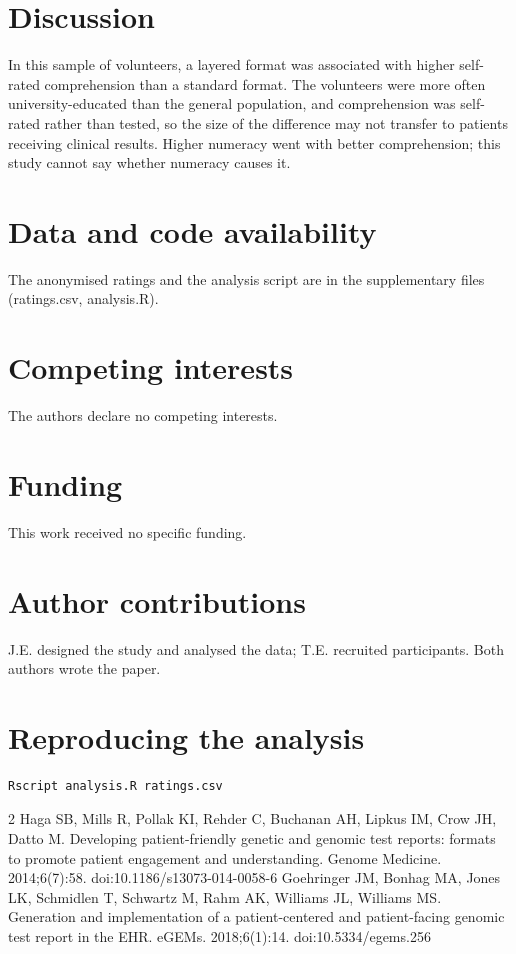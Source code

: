 \documentclass{article}
\begin{document}
\section{Discussion}
In this sample of volunteers, a layered format was associated with higher self-rated comprehension than a
standard format. The volunteers were more often university-educated than the general population, and
comprehension was self-rated rather than tested, so the size of the difference may not transfer to
patients receiving clinical results. Higher numeracy went with better comprehension; this study cannot
say whether numeracy causes it.

\section*{Data and code availability}
The anonymised ratings and the analysis script are in the supplementary files (ratings.csv, analysis.R).

\section*{Competing interests}
The authors declare no competing interests.

\section*{Funding}
This work received no specific funding.

\section*{Author contributions}
J.E. designed the study and analysed the data; T.E. recruited participants. Both authors wrote the paper.

\appendix
\section{Reproducing the analysis}
\begin{verbatim}
Rscript analysis.R ratings.csv
\end{verbatim}

\begin{thebibliography}{2}
 Haga SB, Mills R, Pollak KI, Rehder C, Buchanan AH, Lipkus IM, Crow JH, Datto M. Developing patient-friendly genetic and genomic test reports: formats to promote patient engagement and understanding. Genome Medicine. 2014;6(7):58. doi:10.1186/s13073-014-0058-6
 Goehringer JM, Bonhag MA, Jones LK, Schmidlen T, Schwartz M, Rahm AK, Williams JL, Williams MS. Generation and implementation of a patient-centered and patient-facing genomic test report in the EHR. eGEMs. 2018;6(1):14. doi:10.5334/egems.256
\end{thebibliography}
\end{document}
